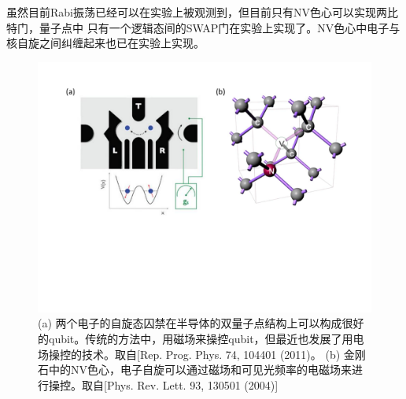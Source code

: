虽然目前Rabi振荡已经可以在实验上被观测到\cite{solid9,solid10}，但目前只有NV色心可以实现两比特门\cite{solid11}，量子点中
只有一个逻辑态间的SWAP门在实验上实现了\cite{solid12}。NV色心中电子与核自旋之间纠缠起来也已在实验上实现\cite{solid13}。
\begin{figure}[htbp]
            \begin{center}
              \includegraphics[width= 0.8\columnwidth]{figures/solid.pdf}
              \caption{(a) 两个电子的自旋态囚禁在半导体的双量子点结构上可以构成很好的qubit。传统的方法中，用磁场来操控qubit，但最近也发展了用电场操控的技术。取自[Rep. Prog. Phys. 74, 104401 (2011)\cite{review2}。
               (b) 金刚石中的NV色心，电子自旋可以通过磁场和可见光频率的电磁场来进行操控。取自[Phys. Rev. Lett. 93, 130501 (2004)\cite{solid11}]
              }
              \label{solid}
            \end{center}
  \end{figure}


